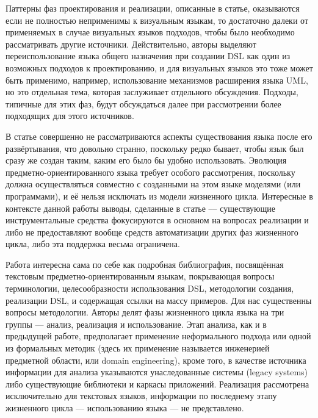 Паттерны фаз проектирования и реализации, описанные в статье, оказываются если не полностью 
неприменимы к визуальным языкам, то достаточно далеки от применяемых в случае визуальных 
языков подходов, чтобы было необходимо рассматривать другие источники. Действительно, 
авторы выделяют переиспользование языка общего назначения при создании DSL как один 
из возможных подходов к проектированию, и для визуальных языков это тоже может быть 
применимо, например, использование механизмов расширения языка UML, но это отдельная 
тема, которая заслуживает отдельного обсуждения. Подходы, типичные для этих фаз, будут 
обсуждаться далее при рассмотрении более подходящих для этого источников.

В статье совершенно не рассматриваются аспекты существования языка после его развёртывания, 
что довольно странно, поскольку редко бывает, чтобы язык был сразу же создан таким, 
каким его было бы удобно использовать. Эволюция предметно-ориентированного языка требует 
особого рассмотрения, поскольку должна осуществляться совместно с созданными на этом языке 
моделями (или программами), и её нельзя исключать из модели жизненного цикла. Интересные 
в контексте данной работы выводы, сделанные в статье –-- существующие инструментальные средства 
фокусируются в основном на вопросах реализации и либо не предоставляют вообще средств 
автоматизации других фаз жизненного цикла, либо эта поддержка весьма ограничена. 

Работа \cite{van2000domain} интересна сама по себе как подробная библиография, посвящённая 
текстовым предметно-ориентированным языкам, покрывающая вопросы терминологии, целесообразности 
использования DSL, методологии создания, реализации DSL, и содержащая ссылки на массу 
примеров. Для нас существенны вопросы методологии. Авторы делят фазы жизненного цикла языка 
на три группы --- анализ, реализация и использование. Этап анализа, как и в предыдущей работе, 
предполагает применение неформального подхода или одной из формальных методик (здесь их 
применение называется инженерией предметной области, или domain engineering), кроме 
того, в качестве источника информации для анализа указываются унаследованные системы 
(legacy systems) либо существующие библиотеки и каркасы приложений. Реализация 
рассмотрена исключительно для текстовых языков, информации по последнему этапу жизненного 
цикла --- использованию языка --- не представлено.

